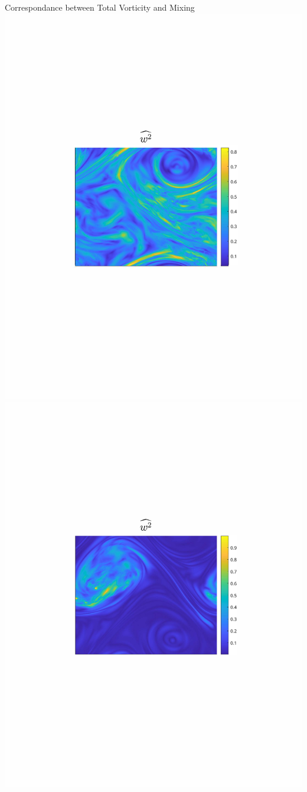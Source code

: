 \documentclass[aspecttatio=169]{beamer}
\begin{document}
\begin{frame}{Correspondance between Total Vorticity and Mixing}
        \includegraphics[width=1\textwidth]{images/Om3B30_uzrms_bar.pdf}
    \emp
        \centering
        \includegraphics[width=1\textwidth]{images/Om10B30_uzrms_bar.pdf}

\end{frame}
\end{document}
